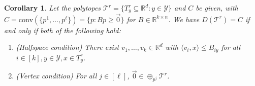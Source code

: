 \documentclass[12pt]{article}
\newcommand{\reals}{\mathbb{R}}
\newcommand{\T}{\mathcal{T}}
\newcommand{\Y}{\mathcal{Y}}
\newcommand{\inprod}[2]{\langle #1, #2 \rangle}%
\newcommand{\conv}{\mathrm{conv}}
\newtheorem{corollary}{Corollary}
\begin{document}
  \begin{corollary} \label{cor:vertex-halfspace-opt}
    Let the polytopes $\T^r = \{T^r_y \subseteq \reals^d : y \in \Y\}$ and $C$ be given, with $C = \conv(\{p^1,\ldots,p^{\ell}\}) = \{p: Bp \geq \vec 0\}$ for $B \in \reals^{k \times n}$.
    We have $D(\T^r) = C$ if and only if both of the following hold:
    \begin{enumerate}
      \item (Halfspace condition) There exist $v_1,\ldots,v_k \in \reals^d$ with $\inprod{v_i}{x} \leq B_{iy}$ for all $i \in [k], y \in \Y, x \in T^r_y$.
      \item (Vertex condition) For all $j \in [\ell]$, $\vec{0} \in \oplus_{p^j} \T^r$.
    \end{enumerate}
  \end{corollary}
\end{document}
